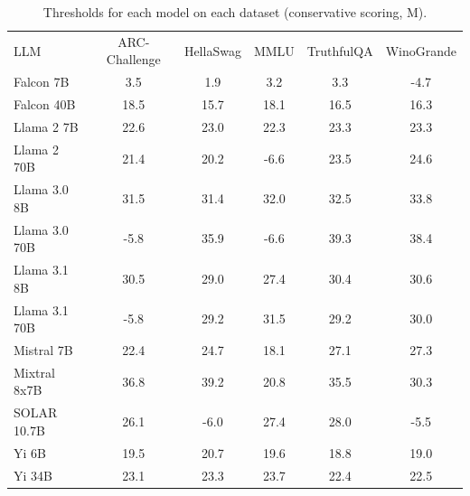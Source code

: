 \begin{table}[h]
\caption{Thresholds for each model on each dataset (conservative scoring, M). }
\label{tab:thresholds_logit_max_k20_w2}
\centering
\begin{tabular}{l S[table-format=3.1] S[table-format=3.1] S[table-format=3.1] S[table-format=3.1] S[table-format=3.1]}
\toprule
LLM & ARC-Challenge & HellaSwag & MMLU & TruthfulQA & WinoGrande \\ 
\cmidrule(lr){1-1} \cmidrule(lr){2-2} \cmidrule(lr){3-3} \cmidrule(lr){4-4} \cmidrule(lr){5-5} \cmidrule(lr){6-6}
Falcon 7B & 3.5 & 1.9 & 3.2 & 3.3 & -4.7\\
Falcon 40B & 18.5 & 15.7 & 18.1 & 16.5 & 16.3\\
Llama 2 7B & 22.6 & 23.0 & 22.3 & 23.3 & 23.3\\
Llama 2 70B & 21.4 & 20.2 & -6.6 & 23.5 & 24.6\\
Llama 3.0 8B & 31.5 & 31.4 & 32.0 & 32.5 & 33.8\\
Llama 3.0 70B & -5.8 & 35.9 & -6.6 & 39.3 & 38.4\\
Llama 3.1 8B & 30.5 & 29.0 & 27.4 & 30.4 & 30.6\\
Llama 3.1 70B & -5.8 & 29.2 & 31.5 & 29.2 & 30.0\\
Mistral 7B & 22.4 & 24.7 & 18.1 & 27.1 & 27.3\\
Mixtral 8x7B & 36.8 & 39.2 & 20.8 & 35.5 & 30.3\\
SOLAR 10.7B & 26.1 & -6.0 & 27.4 & 28.0 & -5.5\\
Yi 6B & 19.5 & 20.7 & 19.6 & 18.8 & 19.0\\
Yi 34B & 23.1 & 23.3 & 23.7 & 22.4 & 22.5\\
\bottomrule
\end{tabular}
\end{table}
